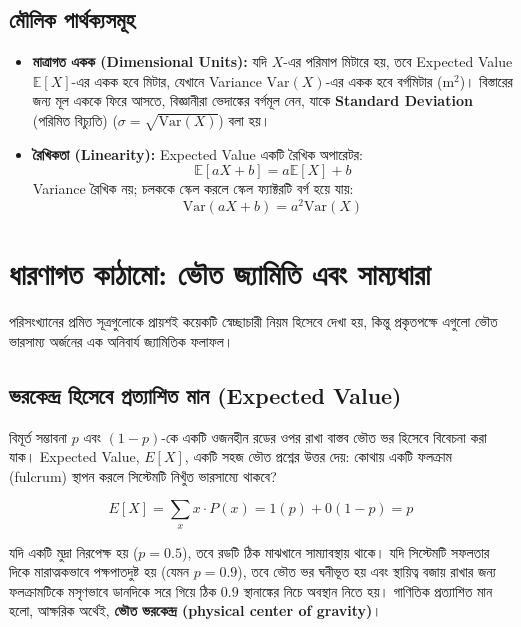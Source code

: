\documentclass[12pt]{article}
\newcommand{\purplehighlight}[1]{\textcolor{purplehl}{\textbf{#1}}}
\begin{document}
\subsection*{মৌলিক পার্থক্যসমূহ}
\begin{itemize}
    \item \textbf{মাত্রাগত একক (Dimensional Units):} যদি $X$-এর পরিমাপ মিটারে হয়, তবে Expected Value $\mathbb{E}[X]$-এর একক হবে মিটার, যেখানে Variance $\text{Var}(X)$-এর একক হবে বর্গমিটার ($\text{m}^2$)। বিস্তারের জন্য মূল এককে ফিরে আসতে, বিজ্ঞানীরা ভেদাঙ্কের বর্গমূল নেন, যাকে \textbf{Standard Deviation} (পরিমিত বিচ্যুতি) ($\sigma = \sqrt{\text{Var}(X)}$) বলা হয়।
    
    \item \textbf{রৈখিকতা (Linearity):} Expected Value একটি রৈখিক অপারেটর:
    \[
    \mathbb{E}[aX + b] = a\mathbb{E}[X] + b
    \]
    Variance রৈখিক নয়; চলককে স্কেল করলে স্কেল ফ্যাক্টরটি বর্গ হয়ে যায়:
    \[
    \text{Var}(aX + b) = a^2\text{Var}(X)
    \]
\end{itemize}

\newpage

\section*{ধারণাগত কাঠামো: ভৌত জ্যামিতি এবং সাম্যধারা}
পরিসংখ্যানের প্রমিত সূত্রগুলোকে প্রায়শই কয়েকটি স্বেচ্ছাচারী নিয়ম হিসেবে দেখা হয়, কিন্তু প্রকৃতপক্ষে এগুলো ভৌত ভারসাম্য অর্জনের এক অনিবার্য জ্যামিতিক ফলাফল।

\subsection*{ভরকেন্দ্র হিসেবে প্রত্যাশিত মান (Expected Value)}
বিমূর্ত সম্ভাবনা $p$ এবং $(1-p)$-কে একটি ওজনহীন রডের ওপর রাখা বাস্তব ভৌত ভর হিসেবে বিবেচনা করা যাক। Expected Value, $E[X]$, একটি সহজ ভৌত প্রশ্নের উত্তর দেয়: কোথায় একটি ফলক্রাম (fulcrum) স্থাপন করলে সিস্টেমটি নিখুঁত ভারসাম্যে থাকবে?

\begin{goldformula}
\begin{equation}
E[X] = \sum_{x} x \cdot P(x) = 1(p) + 0(1 - p) = p
\end{equation}
\end{goldformula}

যদি একটি মুদ্রা নিরপেক্ষ হয় ($p = 0.5$), তবে রডটি ঠিক মাঝখানে সাম্যাবস্থায় থাকে। যদি সিস্টেমটি সফলতার দিকে মারাত্মকভাবে পক্ষপাতদুষ্ট হয় (যেমন $p = 0.9$), তবে ভৌত ভর ঘনীভূত হয় এবং স্থায়িত্ব বজায় রাখার জন্য ফলক্রামটিকে মসৃণভাবে ডানদিকে সরে গিয়ে ঠিক $0.9$ স্থানাঙ্কের নিচে অবস্থান নিতে হয়। গাণিতিক প্রত্যাশিত মান হলো, আক্ষরিক অর্থেই, \purplehighlight{ভৌত ভরকেন্দ্র (physical center of gravity)}।
\end{document}
